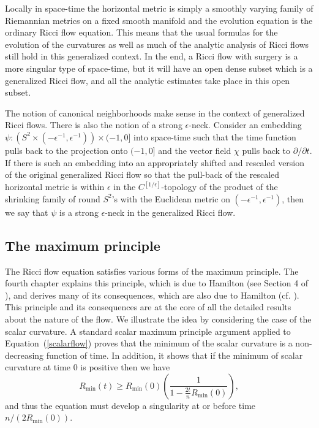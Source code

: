 Locally in space-time the horizontal metric is simply a smoothly varying family
of Riemannian metrics on a fixed smooth manifold and the evolution equation is
the ordinary Ricci flow equation. This means that the usual formulas for the
evolution of the curvatures as well as much of the analytic analysis of Ricci
flows still hold in this generalized context. In the end, a Ricci flow with
surgery is a more singular type of space-time, but it will have an open dense
subset which is a generalized Ricci flow, and all the analytic estimates take
place in this open subset.

The notion of canonical neighborhoods make sense in the context of
generalized Ricci flows. There is also the notion of a strong
$\epsilon$-neck. Consider an embedding $\psi\colon \left(S^2\times
(-\epsilon^{-1},\epsilon^{-1})\right)\times (-1,0]$ into space-time
such that the time function pulls back to the projection onto
$(-1,0]$ and the vector field $\chi$ pulls back to
$\partial/\partial t$. If there is such an embedding into an
appropriately shifted and rescaled version of the original
generalized Ricci flow so that the pull-back of the rescaled
horizontal metric is within $\epsilon$ in the
$C^{[1/\epsilon]}$-topology of the product of the shrinking family
of round $S^2$'s with the Euclidean metric on
$(-\epsilon^{-1},\epsilon^{-1})$, then we say that $\psi$ is a
strong $\epsilon$-neck in the
generalized Ricci flow.




\subsection{The maximum principle}\label{sectmax}

The Ricci flow equation satisfies various forms of the maximum
principle. The fourth chapter explains this principle, which is due
to Hamilton (see Section 4 of \cite{Hamiltonsurvey}), and derives
many of its consequences,  which are also due to Hamilton (cf.
\cite{HamiltonNSRF3M}). This principle and its consequences are at
the core of all the detailed results about the nature of the flow.
We illustrate the idea by considering the case of the scalar
curvature. A standard scalar maximum principle argument applied to
Equation~(\ref{scalarflow}) proves that the minimum of the scalar
curvature is a non-decreasing function of time. In addition, it
shows that if the minimum of scalar curvature at time $0$ is
positive then we have
$$R_\mathrm{min}(t)\ge R_\mathrm{min}(0)\left(\frac{1}{1-\frac{2t}{n}R_\mathrm{min}(0)}\right),$$ and thus the equation must develop a singularity at or
before time $n/\left(2R_\mathrm{min}(0)\right)$.

